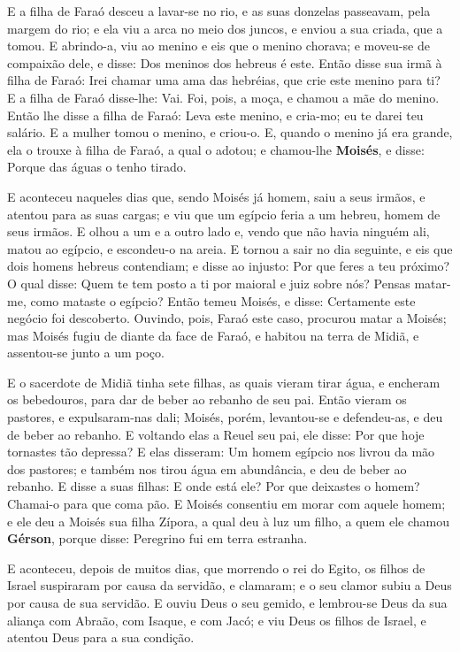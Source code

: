 E a filha de Faraó desceu a lavar-se no rio, e as suas donzelas
passeavam, pela margem do rio; e ela viu a arca no meio dos juncos,
e enviou a sua criada, que a tomou. E abrindo-a, viu ao menino e
eis que o menino chorava; e moveu-se de compaixão dele, e disse: Dos
meninos dos hebreus é este. Então disse sua irmã à filha de
Faraó: Irei chamar uma ama das hebréias, que crie este menino para
ti? E a filha de Faraó disse-lhe: Vai. Foi, pois, a moça, e
chamou a mãe do menino. Então lhe disse a filha de Faraó: Leva
este menino, e cria-mo; eu te darei teu salário. E a mulher tomou o
menino, e criou-o. E, quando o menino já era grande, ela o
trouxe à filha de Faraó, a qual o adotou; e chamou-lhe
\textbf{Moisés}, e disse: Porque das águas o tenho tirado.

E aconteceu naqueles dias que, sendo Moisés já homem, saiu a seus
irmãos, e atentou para as suas cargas; e viu que um egípcio feria a
um hebreu, homem de seus irmãos. E olhou a um e a outro lado
e, vendo que não havia ninguém ali, matou ao egípcio, e escondeu-o
na areia. E tornou a sair no dia seguinte, e eis que dois
homens hebreus contendiam; e disse ao injusto: Por que feres a teu
próximo? O qual disse: Quem te tem posto a ti por maioral e
juiz sobre nós? Pensas matar-me, como mataste o egípcio? Então temeu
Moisés, e disse: Certamente este negócio foi descoberto.
Ouvindo, pois, Faraó este caso, procurou matar a Moisés; mas
Moisés fugiu de diante da face de Faraó, e habitou na terra de
Midiã, e assentou-se junto a um poço.

E o sacerdote de Midiã tinha sete filhas, as quais vieram tirar
água, e encheram os bebedouros, para dar de beber ao rebanho de seu
pai. Então vieram os pastores, e expulsaram-nas dali; Moisés,
porém, levantou-se e defendeu-as, e deu de beber ao rebanho.
E voltando elas a Reuel seu pai, ele disse: Por que hoje
tornastes tão depressa? E elas disseram: Um homem egípcio nos
livrou da mão dos pastores; e também nos tirou água em abundância, e
deu de beber ao rebanho. E disse a suas filhas: E onde está
ele? Por que deixastes o homem? Chamai-o para que coma pão. E
Moisés consentiu em morar com aquele homem; e ele deu a Moisés sua
filha Zípora, a qual deu à luz um filho, a quem ele chamou
\textbf{Gérson}, porque disse: Peregrino fui em terra estranha.

E aconteceu, depois de muitos dias, que morrendo o rei do Egito,
os filhos de Israel suspiraram por causa da servidão, e clamaram; e
o seu clamor subiu a Deus por causa de sua servidão. E ouviu
Deus o seu gemido, e lembrou-se Deus da sua aliança com Abraão, com
Isaque, e com Jacó; e viu Deus os filhos de Israel, e atentou
Deus para a sua condição.

